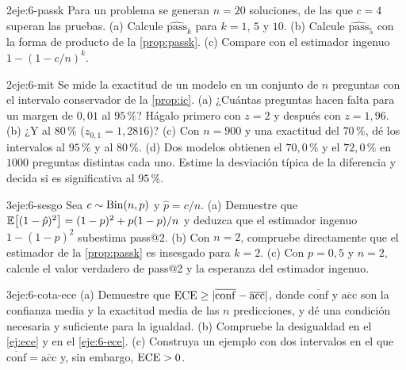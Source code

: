 \begin{ejercicio}{2}{eje:6-passk}
Para un problema se generan $n=20$ soluciones, de las que $c=4$ superan las pruebas. (a) Calcule $\widehat{\mathrm{pass}}_k$ para $k=1$, $5$ y $10$. (b) Calcule $\widehat{\mathrm{pass}}_5$ con la forma de producto de la \cref{prop:passk}. (c) Compare con el estimador ingenuo $1-(1-c/n)^{k}$.
\end{ejercicio}

\begin{ejercicio}{2}{eje:6-mit}
Se mide la exactitud de un modelo en un conjunto de $n$ preguntas con el intervalo conservador de la \cref{prop:ic}. (a) ¿Cuántas preguntas hacen falta para un margen de $0{,}01$ al $95\,\%$? Hágalo primero con $z=2$ y después con $z=1{,}96$. (b) ¿Y al $80\,\%$ ($z_{0{,}1}=1{,}2816$)? (c) Con $n=900$ y una exactitud del $70\,\%$, dé los intervalos al $95\,\%$ y al $80\,\%$. (d) Dos modelos obtienen el $70{,}0\,\%$ y el $72{,}0\,\%$ en $1000$ preguntas distintas cada uno. Estime la desviación típica de la diferencia y decida si es significativa al $95\,\%$.
\end{ejercicio}

\begin{ejercicio}{3}{eje:6-sesgo}
Sea $c\sim\operatorname{Bin}(n,p)$ y $\hat p=c/n$. (a) Demuestre que $\mathbb{E}\bigl[(1-\hat p)^{2}\bigr]=(1-p)^{2}+p(1-p)/n$ y deduzca que el estimador ingenuo $1-(1-\hat p)^{2}$ subestima pass@2. (b) Con $n=2$, compruebe directamente que el estimador de la \cref{prop:passk} es insesgado para $k=2$. (c) Con $p=0{,}5$ y $n=2$, calcule el valor verdadero de pass@2 y la esperanza del estimador ingenuo.
\end{ejercicio}

\begin{ejercicio}{3}{eje:6-cota-ece}
(a) Demuestre que $\operatorname{ECE}\ge\lvert\overline{\mathrm{conf}}-\overline{\mathrm{acc}}\rvert$, donde $\overline{\mathrm{conf}}$ y $\overline{\mathrm{acc}}$ son la confianza media y la exactitud media de las $n$ predicciones, y dé una condición necesaria y suficiente para la igualdad. (b) Compruebe la desigualdad en el \cref{ej:ece} y en el \cref{eje:6-ece}. (c) Construya un ejemplo con dos intervalos en el que $\overline{\mathrm{conf}}=\overline{\mathrm{acc}}$ y, sin embargo, $\operatorname{ECE}>0$.
\end{ejercicio}
